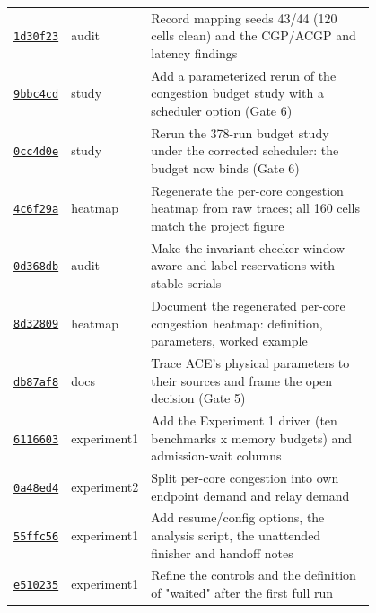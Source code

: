 {\begin{longtable}{@{}lp{0.12\linewidth}p{0.68\linewidth}@{}}
\href{https://github.com/sanjeevkrishnaa/Compiler-Driven-ACE/commit/1d30f23}{\texttt{1d30f23}} & audit & Record mapping seeds 43/44 (120 cells clean) and the CGP/ACGP and latency findings \\
\href{https://github.com/sanjeevkrishnaa/Compiler-Driven-ACE/commit/9bbc4cd}{\texttt{9bbc4cd}} & study & Add a parameterized rerun of the congestion budget study with a scheduler option (Gate 6) \\
\href{https://github.com/sanjeevkrishnaa/Compiler-Driven-ACE/commit/0cc4d0e}{\texttt{0cc4d0e}} & study & Rerun the 378-run budget study under the corrected scheduler: the budget now binds (Gate 6) \\
\href{https://github.com/sanjeevkrishnaa/Compiler-Driven-ACE/commit/4c6f29a}{\texttt{4c6f29a}} & heatmap & Regenerate the per-core congestion heatmap from raw traces; all 160 cells match the project figure \\
\href{https://github.com/sanjeevkrishnaa/Compiler-Driven-ACE/commit/0d368db}{\texttt{0d368db}} & audit & Make the invariant checker window-aware and label reservations with stable serials \\
\href{https://github.com/sanjeevkrishnaa/Compiler-Driven-ACE/commit/8d32809}{\texttt{8d32809}} & heatmap & Document the regenerated per-core congestion heatmap: definition, parameters, worked example \\
\href{https://github.com/sanjeevkrishnaa/Compiler-Driven-ACE/commit/db87af8}{\texttt{db87af8}} & docs & Trace ACE's physical parameters to their sources and frame the open decision (Gate 5) \\
\href{https://github.com/sanjeevkrishnaa/Compiler-Driven-ACE/commit/6116603}{\texttt{6116603}} & experiment1 & Add the Experiment 1 driver (ten benchmarks x memory budgets) and admission-wait columns \\
\href{https://github.com/sanjeevkrishnaa/Compiler-Driven-ACE/commit/0a48ed4}{\texttt{0a48ed4}} & experiment2 & Split per-core congestion into own endpoint demand and relay demand \\
\href{https://github.com/sanjeevkrishnaa/Compiler-Driven-ACE/commit/55ffc56}{\texttt{55ffc56}} & experiment1 & Add resume/config options, the analysis script, the unattended finisher and handoff notes \\
\href{https://github.com/sanjeevkrishnaa/Compiler-Driven-ACE/commit/e510235}{\texttt{e510235}} & experiment1 & Refine the controls and the definition of "waited" after the first full run \\

\end{longtable}}
